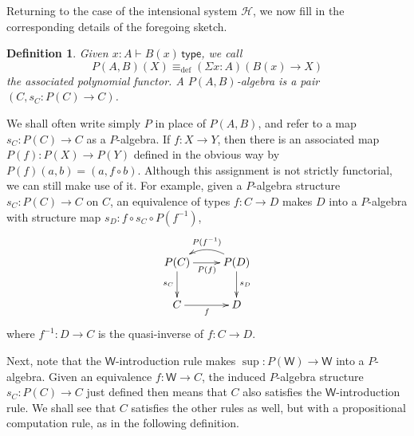 \documentclass[reqno,10pt,a4paper,oneside]{amsart}
\numberwithin{equation}{section}
\theoremstyle{mythm}
\theoremstyle{mydef}
\newtheorem{definition}[theorem]{Definition}
\theoremstyle{myrmk}
\newtheorem{remark}[theorem]{Remark}
\newcommand{\deq}{\equiv}
\newcommand{\defeq}{\deq_{\mathrm{def}}}
\newcommand{\Hint}{\mathcal{H}}
\newcommand{\type}{\mathsf{type}}
\newcommand{\W}{\mathsf{W}}
\newcommand{\Bool}{\mathsf{Bool}}
\begin{document}

Returning to the case of the intensional system $\Hint$, we now fill in the corresponding details of the foregoing sketch.

\begin{definition}
Given $x:A \vdash B(x)\, \type$, we call $$P(A,B)(X) \defeq (\Sigma x:A) (B(x)\to X)$$ the associated \emph{polynomial functor}.  A \emph{$P(A,B)$-algebra} is a pair $(C, s_C: P(C) \to C)$.    
\end{definition}

We shall often write simply $P$ in place of $P(A,B)$, and refer to a map $s_C : P(C)\to C$ as a $P$-algebra.  
If $f : X\to Y$, then there is an associated map $P(f) : P(X)\to P(Y)$ defined in the obvious way by $P(f)(a, b) = (a,f\circ b)
$.  Although this assignment is not strictly functorial, we can still make use of it. For example, given a $P$-algebra structure $s_C :P(C)\to C$ on $C$, an equivalence of types $f : C \to D$ makes $D$ into a $P$-algebra with structure map $s_D : f\circ s_C\circ P(f^{-1})$,
  \[
\xymatrix{
P(C) \ar[d]_{s_C} \ar[r]_{P(f)} & \ar@/_1pc/[l]_{P(f^{-1})} P(D)  \ar[d]^{s_D}  \\
 C  \ar[r]_{f} & D
 }
 \]
 where $f^{-1} : D\to C$ is the quasi-inverse of $f : C\to D$.


 
Next, note that the $\W$-introduction rule makes $\sup : P(\W)\to \W$ into a $P$-algebra.  Given an equivalence  $f : \W \to C$, the induced $P$-algebra structure $s_C:P(C)\to C$ just defined then means that $C$ also satisfies the $\W$-introduction rule.  We shall see that $C$ satisfies the other rules as well, but with a propositional computation rule, as in the following definition.
\end{document}
